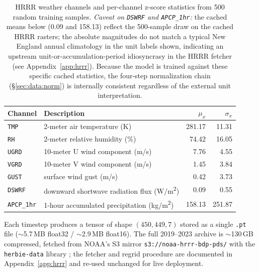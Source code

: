 \begin{table}[!h]
\centering
\small
\caption{HRRR weather channels and per-channel z-score statistics from 500 random training samples. \emph{Caveat on \texttt{DSWRF} and \texttt{APCP\_1hr}:} the cached means below (0.09 and 158.13) reflect the 500-sample draw on the cached HRRR rasters; the absolute magnitudes do not match a typical New England annual climatology in the unit labels shown, indicating an upstream unit-or-accumulation-period idiosyncrasy in the HRRR fetcher (see Appendix~\ref{app:hrrr}). Because the model is trained against these specific cached statistics, the four-step normalization chain (\S\ref{sec:data:norm}) is internally consistent regardless of the external unit interpretation.}
\label{tab:weather_stats}
\begin{tabular}{@{}llrr@{}}
\toprule
Channel & Description & $\mu_x$ & $\sigma_x$ \\
\midrule
\texttt{TMP}      & 2-meter air temperature (K)                         & 281.17 & \phantom{00}11.31 \\
\texttt{RH}       & 2-meter relative humidity (\%)                      & \phantom{0}74.42 & \phantom{00}16.05 \\
\texttt{UGRD}     & 10-meter U wind component (m/s)                     & \phantom{00}7.76 & \phantom{000}4.55 \\
\texttt{VGRD}     & 10-meter V wind component (m/s)                     & \phantom{00}1.45 & \phantom{000}3.84 \\
\texttt{GUST}     & surface wind gust (m/s)                             & \phantom{00}0.42 & \phantom{000}3.73 \\
\texttt{DSWRF}    & downward shortwave radiation flux (W/m\textsuperscript{2}) & \phantom{00}0.09 & \phantom{000}0.55 \\
\texttt{APCP\_1hr}& 1-hour accumulated precipitation (kg/m\textsuperscript{2})  & 158.13 & \phantom{0}251.87 \\
\bottomrule
\end{tabular}
\end{table}

Each timestep produces a tensor of shape $(450, 449, 7)$ stored as a single \texttt{.pt} file ($\sim$5.7\,MB float32 / $\sim$2.9\,MB float16). The full 2019--2023 archive is $\sim$130\,GB compressed, fetched from NOAA's S3 mirror \texttt{s3://noaa-hrrr-bdp-pds/} with the \texttt{herbie-data} library \citep{blaylock2023herbie}; the fetcher and regrid procedure are documented in Appendix~\ref{app:hrrr} and re-used unchanged for live deployment.

